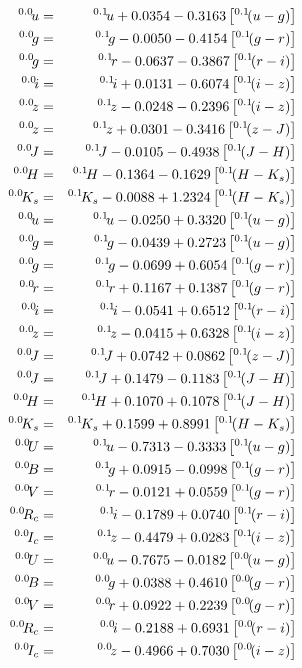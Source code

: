 \documentclass[10pt,preprint]{aastex}
\newcommand{\band}[2]{\ensuremath{^{{#1}}\!{#2}}}
\begin{document}
 
\begin{eqnarray}
\band{0.0}{u} &=& \band{0.1}{u} + 0.0354 - 0.3163 \left[ \band{0.1}{(u-g)} \right] \cr
\band{0.0}{g} &=& \band{0.1}{g} - 0.0050 - 0.4154 \left[ \band{0.1}{(g-r)} \right] \cr
\band{0.0}{g} &=& \band{0.1}{r} - 0.0637 - 0.3867 \left[ \band{0.1}{(r-i)} \right] \cr
\band{0.0}{i} &=& \band{0.1}{i} + 0.0131 - 0.6074 \left[ \band{0.1}{(i-z)} \right] \cr
\band{0.0}{z} &=& \band{0.1}{z} - 0.0248 - 0.2396 \left[ \band{0.1}{(i-z)} \right] \cr
\band{0.0}{z} &=& \band{0.1}{z} + 0.0301 - 0.3416 \left[ \band{0.1}{(z-J)} \right] \cr
\band{0.0}{J} &=& \band{0.1}{J} - 0.0105 - 0.4938 \left[ \band{0.1}{(J-H)} \right] \cr
\band{0.0}{H} &=& \band{0.1}{H} - 0.1364 - 0.1629 \left[ \band{0.1}{(H-K_s)} \right] \cr
\band{0.0}{K_s} &=& \band{0.1}{K_s} - 0.0088 + 1.2324 \left[ \band{0.1}{(H-K_s)} \right] \cr
\band{0.0}{u} &=& \band{0.1}{u} - 0.0250 + 0.3320 \left[ \band{0.1}{(u-g)} \right] \cr
\band{0.0}{g} &=& \band{0.1}{g} - 0.0439 + 0.2723 \left[ \band{0.1}{(u-g)} \right] \cr
\band{0.0}{g} &=& \band{0.1}{g} - 0.0699 + 0.6054 \left[ \band{0.1}{(g-r)} \right] \cr
\band{0.0}{r} &=& \band{0.1}{r} + 0.1167 + 0.1387 \left[ \band{0.1}{(g-r)} \right] \cr
\band{0.0}{i} &=& \band{0.1}{i} - 0.0541 + 0.6512 \left[ \band{0.1}{(r-i)} \right] \cr
\band{0.0}{z} &=& \band{0.1}{z} - 0.0415 + 0.6328 \left[ \band{0.1}{(i-z)} \right] \cr
\band{0.0}{J} &=& \band{0.1}{J} + 0.0742 + 0.0862 \left[ \band{0.1}{(z-J)} \right] \cr
\band{0.0}{J} &=& \band{0.1}{J} + 0.1479 - 0.1183 \left[ \band{0.1}{(J-H)} \right] \cr
\band{0.0}{H} &=& \band{0.1}{H} + 0.1070 + 0.1078 \left[ \band{0.1}{(J-H)} \right] \cr
\band{0.0}{K_s} &=& \band{0.1}{K_s} + 0.1599 + 0.8991 \left[ \band{0.1}{(H-K_s)} \right] \cr
\band{0.0}{U} &=& \band{0.1}{u} - 0.7313 - 0.3333 \left[ \band{0.1}{(u-g)} \right] \cr
\band{0.0}{B} &=& \band{0.1}{g} + 0.0915 - 0.0998 \left[ \band{0.1}{(g-r)} \right] \cr
\band{0.0}{V} &=& \band{0.1}{r} - 0.0121 + 0.0559 \left[ \band{0.1}{(g-r)} \right] \cr
\band{0.0}{R_c} &=& \band{0.1}{i} - 0.1789 + 0.0740 \left[ \band{0.1}{(r-i)} \right] \cr
\band{0.0}{I_c} &=& \band{0.1}{z} - 0.4479 + 0.0283 \left[ \band{0.1}{(i-z)} \right] \cr
\band{0.0}{U} &=& \band{0.0}{u} - 0.7675 - 0.0182 \left[ \band{0.0}{(u-g)} \right] \cr
\band{0.0}{B} &=& \band{0.0}{g} + 0.0388 + 0.4610 \left[ \band{0.0}{(g-r)} \right] \cr
\band{0.0}{V} &=& \band{0.0}{r} + 0.0922 + 0.2239 \left[ \band{0.0}{(g-r)} \right] \cr
\band{0.0}{R_c} &=& \band{0.0}{i} - 0.2188 + 0.6931 \left[ \band{0.0}{(r-i)} \right] \cr
\band{0.0}{I_c} &=& \band{0.0}{z} - 0.4966 + 0.7030 \left[ \band{0.0}{(i-z)} \right] \cr
\end{eqnarray}
\end{document}
